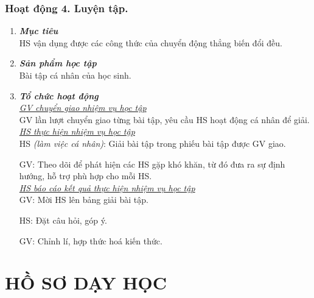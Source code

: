 \subsubsection{Hoạt động 4. Luyện tập.}
\begin{enumerate}[label=\bfseries\itshape \arabic*.]
	\item \textbf{\textit{Mục tiêu}}\\
	HS vận dụng được các công thức của chuyển động thẳng biến đổi đều.
	\item \textbf{\textit{Sản phẩm học tập}}\\
	Bài tập cá nhân của học sinh.
	\item \textbf{\textit{Tổ chức hoạt động}}\\
	\textit{\underline{GV chuyển giao nhiệm vụ học tập}}\\
	GV lần lượt chuyển giao từng bài tập, yêu cầu HS hoạt động cá nhân để giải.\\
	\textit{\underline{HS thực hiện nhiệm vụ học tập}}\\
	HS \textit{(làm việc cá nhân)}:  Giải bài tập trong phiếu bài tập được GV giao. 
	
	GV: Theo dõi để phát hiện các HS gặp khó khăn, từ đó đưa ra sự định hướng, hỗ trợ phù hợp cho mỗi HS.\\
	\textit{\underline{HS báo cáo kết quả thực hiện nhiệm vụ học tập}}\\
	GV: Mời HS lên bảng giải bài tập.
	
	HS: Đặt câu hỏi, góp ý.
	
	GV: Chỉnh lí, hợp thức hoá kiến thức.
	
\end{enumerate}
\section{HỒ SƠ DẠY HỌC}
